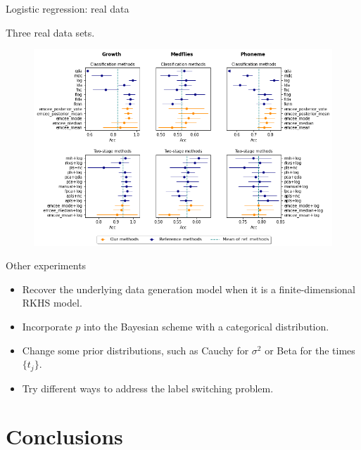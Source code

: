 \documentclass[9pt, english, professionalfonts]{beamer}
\begin{document}
\begin{frame}{Logistic regression: real data}
  \begin{center}
    Three real data sets.
  \end{center}
    \vspace{.5em}
  \begin{figure}
    \includegraphics[width=.8\textwidth]{clf_emcee_real}
  \end{figure}
\end{frame}

\begin{frame}{Other experiments}
\begin{itemize}
  \item Recover the underlying data generation model when it is a finite-dimensional RKHS model.
  \item Incorporate \(p\) into the Bayesian scheme with a categorical distribution.
  \item Change some prior distributions, such as Cauchy for \(\sigma^2\) or Beta for the times \(\{t_j\}\).
  \item Try different ways to address the label switching problem.
\end{itemize}
\end{frame}

\section{Conclusions}
\end{document}
